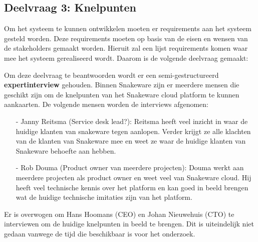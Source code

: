 \subsection{Deelvraag 3: Knelpunten}
Om het systeem te kunnen ontwikkelen moeten er requirements aan het systeem gesteld worden.
Deze requirements moeten op basis van de eisen en wensen van de stakeholders gemaakt worden.
Hieruit zal een lijst requirements komen waar mee het systeem gerealiseerd wordt.
Daarom is de volgende deelvraag gemaakt:

\begin{center}
    \textit{\SubquestionThree}
\end{center}

\whitespace[0.2]
Om deze deelvraag te beantwoorden wordt er een semi-gestructureerd \textbf{expertinterview} gehouden.
Binnen Snakeware zijn er meerdere mensen die geschikt zijn om de knelpunten van het Snakeware cloud platform te kunnen aankaarten.
De volgende mensen worden de interviews afgenomen:
\begin{itemize}
    \item[-] Janny Reitsma (Service desk lead?): Reitsma heeft veel inzicht in waar de huidige klanten van snakeware tegen aanlopen.
        Verder krijgt ze alle klachten van de klanten van Snakeware mee en weet ze waar de huidige klanten van Snakeware behoefte aan hebben.
    \item[-] Rob Douma (Product owner van meerdere projecten): Douma werkt aan meerdere projecten als product owner en weet veel van Snakeware cloud.
        Hij heeft veel technische kennis over het platform en kan goed in beeld brengen wat de huidige technische imitaties zijn van het platform.
\end{itemize}

\whitespace
Er is overwogen om Hans Hoomans (CEO) en Johan Nieuwehuis (CTO) te interviewen om de huidige knelpunten in beeld te brengen.
Dit is uiteindelijk niet gedaan vanwege de tijd die beschikbaar is voor het onderzoek.
